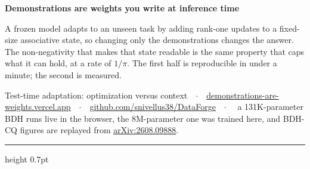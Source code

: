 \documentclass[a4paper,9pt]{extarticle}
\newcommand{\arx}[1]{\href{https://arxiv.org/abs/#1}{arXiv:#1}}
\begin{document}
\fontsize{8.6}{10.15}\selectfont

{\sffamily\bfseries\fontsize{16.5}{18}\selectfont Demonstrations are weights you write at inference time\par}
\vspace{0.9ex}
{\fontsize{9.2}{11.4}\selectfont A frozen model adapts to an unseen task by adding rank-one updates
to a fixed-size associative state, so changing only the demonstrations changes the answer. The
non-negativity that makes that state readable is the same property that caps what it can hold, at a
rate of $1/\pi$. The first half is reproducible in under a minute; the second is measured.\par}
\vspace{1.0ex}
{\sffamily\fontsize{6.6}{8}\selectfont\color{mid} Test-time adaptation: optimization versus
context~~$\cdot$~~\href{https://demonstrations-are-weights.vercel.app}{demonstrations-are-weights.vercel.app}~~$\cdot$~~\href{https://github.com/snivellus38/DataForge}{github.com/snivellus38/DataForge}~~$\cdot$~~
a 131K-parameter BDH runs live in the browser, the 8M-parameter one was trained here, and BDH-CQ
figures are replayed from \arx{2608.09888}.\par}
\vspace{0.5ex}
{\color{rule}\hrule height 0.7pt}
\vspace{0.3ex}
\end{document}
